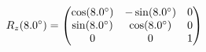 \documentclass[preview]{standalone}
\begin{document}
\begin{align*}
\special{dvisvgm:raw <g id='unique000'>}R_z(8.0^\circ) = \begin{pmatrix} \cos(8.0^\circ) & -\sin(8.0^\circ) & 0 \\ \sin(8.0^\circ) & \cos(8.0^\circ) & 0 \\ 0 & 0 & 1 \end{pmatrix}\special{dvisvgm:raw </g>}
\end{align*}
\end{document}
